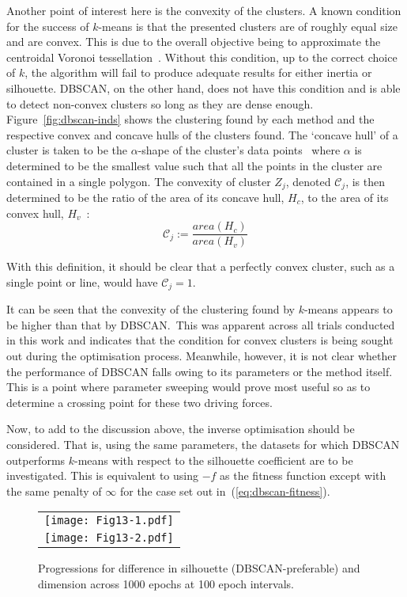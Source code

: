 \documentclass[11pt]{article}
\newlength{\imgwidth}
\begin{document}
Another point of interest here is the convexity of the clusters. A known
condition for the success of \(k\)-means is that the presented clusters are of
roughly equal size and are convex. This is due to the overall objective being to
approximate the centroidal Voronoi tessellation~\cite{Du2006}. Without this
condition, up to the correct choice of \(k\), the algorithm will fail to produce
adequate results for either inertia or silhouette. DBSCAN, on the other hand,
does not have this condition and is able to detect non-convex clusters so long
as they are dense enough. Figure~\ref{fig:dbscan-inds} shows the clustering
found by each method and the respective convex and concave hulls of the clusters
found. The `concave hull' of a cluster is taken to be the \(\alpha\)-shape of
the cluster's data points~\cite{Edelsbrunner1983} where \(\alpha\) is determined
to be the smallest value such that all the points in the cluster are contained
in a single polygon. The convexity of cluster \(Z_j\), denoted
\(\mathcal{C}_j\), is then determined to be the ratio of the area of its concave
hull, \(H_c\), to the area of its convex hull, \(H_v\)~\cite{Sonka1993}:
\begin{equation}
    \mathcal{C}_j := \frac{area(H_c)}{area(H_v)}
\end{equation}

With this definition, it should be clear that a perfectly convex cluster, such
as a single point or line, would have \(\mathcal{C}_j = 1\).

It can be seen that the convexity of the clustering found by \(k\)-means appears
to be higher than that by DBSCAN.\ This was apparent across all trials conducted
in this work and indicates that the condition for convex clusters is being
sought out during the optimisation process. Meanwhile, however, it is not clear
whether the performance of DBSCAN falls owing to its parameters or the method
itself. This is a point where parameter sweeping would prove most useful so as
to determine a crossing point for these two driving forces.

Now, to add to the discussion above, the inverse optimisation should be
considered. That is, using the same parameters, the datasets for which DBSCAN
outperforms \(k\)-means with respect to the silhouette coefficient are to be
investigated. This is equivalent to using \(-f\) as the fitness function
except with the same penalty of \(\infty\) for the case set out
in~(\ref{eq:dbscan-fitness}).

\begin{figure}[htbp]
    \centering
    \begin{tabular}{c}
        \texttt{[image: Fig13-1.pdf]}
        \\
        \texttt{[image: Fig13-2.pdf]}
    \end{tabular}
    \caption{%
        Progressions for difference in silhouette (DBSCAN-preferable) and
        dimension across 1000 epochs at 100 epoch intervals.
    }\label{fig:negative-prog}
\end{figure}
\end{document}
